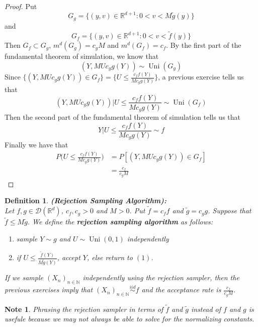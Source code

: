 \documentclass[12pt]{amsart}
\newtheorem{defn}[thm]{Definition}
\newtheorem{note}[thm]{Note}
\newcommand{\N}{\mathbb{N}}
\newcommand{\R}{\mathbb{R}}
\newcommand{\MD}{\mathcal{D}}
\newcommand{\iid}{\stackrel{iid}{\sim}}
\DeclareMathOperator{\uni}{Uni}
\begin{document}
	\begin{proof}
		Put $$G_g = \{(y,v) \in \R^{d+1}: 0< v < M\tilde{g}(y)\} $$ and $$ G_f = \{(y,v) \in \R^{d+1}: 0< v < \tilde{f}(y)\} $$ 
		Then $G_f \subset G_g$, $m^d(G_g) = c_gM$ and $m^d(G_f) =c_f$. By the first part of the fundamental theorem of simulation, we know that $$(Y, MUc_gg(Y)) \sim \uni(G_g)$$ 
		Since $\{(Y, MUc_gg(Y)) \in G_f \} = \{U \leq \frac{c_ff(Y)}{Mc_gg(Y)}\}$, a previous exercise tells us that $$(Y, MUc_gg(Y))|U \leq \frac{c_ff(Y)}{Mc_gg(Y)} \sim \uni(G_f)$$
		Then the second part of the fundamental theorem of simulation tells us that $$Y|U \leq \frac{c_ff(Y)}{Mc_gg(Y)} \sim f$$
		Finally we have that
		\begin{align*}
			P \bigg( U \leq \frac{c_ff(Y)}{Mc_gg(Y)} \bigg) 
			&= P [(Y, MUc_gg(Y)) \in G_f ]\\
			&= \frac{c_f}{c_gM}
		\end{align*}
	\end{proof}

	\begin{defn}\textbf{(Rejection Sampling Algorithm):} \\
		Let $f, g \in \MD(\R^d)$, $c_f,c_g>0$ and $M > 0$. Put $\tilde{f} = c_f f$ and $\tilde{g} = c_g g$. Suppose that $\tilde{f} \leq M \tilde{g}$. We define the \textbf{rejection sampling algorithm} as follows:
		\begin{enumerate}
			\item sample $Y \sim g$ and $U \sim \uni(0,1)$ independently
			\item if $U \leq \frac{\tilde{f}(Y)}{M\tilde{g}(Y)} $, accept $Y$, else return to $(1)$.
		\end{enumerate}
		If we sample $(X_n)_{n \in \N}$ independently using the rejection sampler, then the previous exercises imply that $(X_n)_{n \in \N} \iid f$ and the acceptance rate is $\frac{c_f}{c_gM}$.
	\end{defn}

	\begin{note}
		Phrasing the rejection sampler in terms of $\tilde{f}$ and $\tilde{g}$ instead of $f$ and $g$ is usefule because we may not always be able to solve for the normalizing constants.
	\end{note}

	
\end{document}

